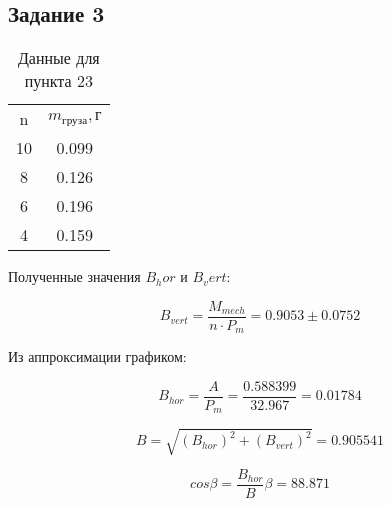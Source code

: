 \documentclass[a4paper]{article}
\begin{document}
\subsection{Задание 3}

\begin{table}[h]
    \centering
        \begin{tabular}{|c|c|}
        \cline{1-2}
        n & $m_{\textit{груза}}, \textit{г}$\\ \cline{1-2}
        10 & 0.099\\ \cline{1-2}
        8 & 0.126\\ \cline{1-2}
        6 & 0.196\\ \cline{1-2}
        4 & 0.159\\ \cline{1-2}
        \end{tabular}
        \caption{Данные для пункта 23}
        \label{tab:my_label}
    \end{table}


Полученные значения $B_hor$ и $B_vert$:

\begin{center}
    \begin{equation}
         B_{vert} = \frac{M_{mech}}{n\cdot P_m} = 0.9053 \pm 0.0752
    \end{equation}    
\end{center}

Из аппроксимации графиком:

\begin{center}
    \begin{equation}
         B_{hor} = \frac{A}{P_m} = \frac{0.588399}{32.967} = 0.01784
    \end{equation}    
\end{center}

\begin{center}
    \begin{equation}
         B = \sqrt{(B_{hor})^2 + (B_{vert})^2} = 0.905541
    \end{equation}    
\end{center}

\begin{center}
    \begin{equation}
         cos\beta = \frac{B_{hor}}{B}
         \beta = 88.871
    \end{equation}    
\end{center}
\end{document}
